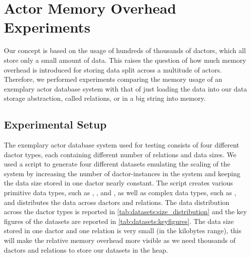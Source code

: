 
\section{Actor Memory Overhead Experiments}\label{sec:experiments}

  Our concept is based on the usage of hundreds of thousands of \glspl{dactor}, which all store only a small amount of data.
  This raises the question of how much memory overhead is introduced for storing data split across a multitude of actors.
  Therefore, we performed experiments comparing the memory usage of an exemplary actor database system with that of just loading the data into our data storage abstraction, called relations, or in a big string into memory.

\subsection{Experimental Setup}

  The exemplary actor database system used for testing consists of four different \gls{dactor} types, each containing different number of relations and data sizes.
  We used a script to generate four different datasets emulating the scaling of the system by increasing the number of \gls{dactor}-instances in the system and keeping the data size stored in one \gls{dactor} nearly constant.
  The script creates various primitive data types, such as , , and , as well as complex data types, such as , and distributes the data across \glspl{dactor} and relations.
  The data distribution across the \gls{dactor} types is reported in \cref{tab:datasets:size_distribution} and the key figures of the datasets are reported in \cref{tab:datasets:keyfigures}.
  The data size stored in one \gls{dactor} and one relation is very small (in the kilobytes range), this will make the relative memory overhead more visible as we need thousands of \glspl{dactor} and relations to store our datasets in the heap.
  
